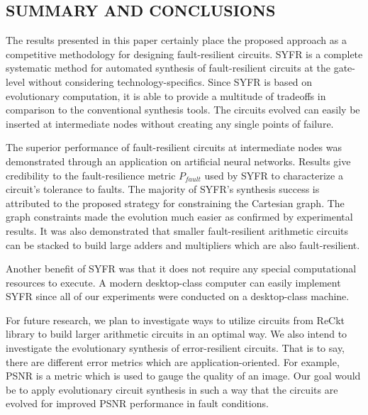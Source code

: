 \begin{center}
\section{SUMMARY AND CONCLUSIONS}
\end{center}



The results presented in this paper certainly place the proposed approach as a competitive methodology for designing fault-resilient circuits. SYFR is a complete systematic method for automated synthesis of fault-resilient circuits at the gate-level without considering technology-specifics. Since SYFR is based on evolutionary computation, it is able to provide a multitude of tradeoffs in comparison to the conventional synthesis tools. The circuits evolved can easily be inserted at intermediate nodes without creating any single points of failure.

The superior performance of fault-resilient circuits at intermediate nodes was demonstrated through an application on artificial neural networks. Results give credibility to the fault-resilience metric $P_{fault}$ used by SYFR to characterize a circuit's tolerance to faults. The majority of SYFR's synthesis success is attributed to the proposed strategy for constraining the Cartesian graph. The graph constraints made the evolution much easier as confirmed by experimental results. It was also demonstrated that smaller fault-resilient arithmetic circuits can be stacked to build large adders and multipliers which are also fault-resilient. 

Another benefit of SYFR was that it does not require any special computational resources to execute. A modern desktop-class computer can easily implement SYFR since all of our experiments were conducted on a desktop-class machine. 

For future research, we plan to investigate ways to utilize circuits from ReCkt library to build larger arithmetic circuits in an optimal way. We also intend to investigate the evolutionary synthesis of error-resilient circuits. That is to say, there are different error metrics which are application-oriented. For example, PSNR is a metric which is used to gauge the quality of an image. Our goal would be to apply evolutionary circuit synthesis in such a way that the circuits are evolved for improved PSNR performance in fault conditions.
